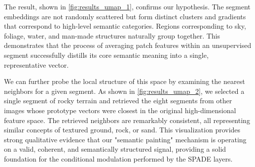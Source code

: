 The result, shown in \cref{fig:results_umap_1}, confirms our hypothesis. The segment embeddings are not randomly scattered but form distinct clusters and gradients that correspond to high-level semantic categories. Regions corresponding to sky, foliage, water, and man-made structures naturally group together. This demonstrates that the process of averaging patch features within an unsupervised segment successfully distills its core semantic meaning into a single, representative vector.

We can further probe the local structure of this space by examining the nearest neighbors for a given segment. As shown in \cref{fig:results_umap_2}, we selected a single segment of rocky terrain and retrieved the eight segments from other images whose prototype vectors were closest in the original high-dimensional feature space. The retrieved neighbors are remarkably consistent, all representing similar concepts of textured ground, rock, or sand. This visualization provides strong qualitative evidence that our "semantic painting" mechanism is operating on a valid, coherent, and semantically structured signal, providing a solid foundation for the conditional modulation performed by the SPADE layers.


